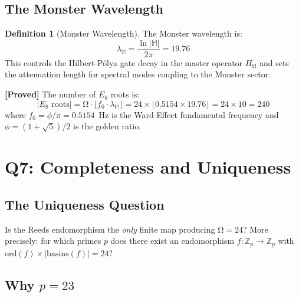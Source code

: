 \documentclass[12pt,a4paper]{article}
\newcommand{\proved}[1]{\textcolor{proved}{\textbf{[Proved]}} #1}
\theoremstyle{definition}\newtheorem{definition}[theorem]{Definition}
\theoremstyle{remark}\newtheorem{remark}[theorem]{Remark}
\renewcommand{\O}{\mathrm{\Omega}}
\newcommand{\Monster}{\mathbb{M}}\newcommand{\Leech}{\Lambda_{24}}
\newcommand{\HOmega}{H_\O}\newcommand{\Jcoup}{J}\newcommand{\Basin}{\mathcal{B}}
\begin{document}
\subsection{The Monster Wavelength}

\begin{definition}[Monster Wavelength]
The Monster wavelength is:
\begin{equation}
  \lambda_\Monster = \frac{\ln|\Monster|}{2\pi} = 19.76
\end{equation}
This controls the Hilbert-P\'olya gate decay in the master operator $\HOmega$
and sets the attenuation length for spectral modes coupling to the Monster
sector.
\end{definition}

\begin{proposition}
\label{prop:e8}
\proved{The number of $E_8$ roots is:}
\begin{equation}
  |E_8 \text{ roots}| = \O \cdot \lfloor f_0 \cdot \lambda_\Monster \rfloor
  = 24 \times \lfloor 0.5154 \times 19.76 \rfloor
  = 24 \times 10 = 240
\end{equation}
where $f_0 = \phi / \pi = 0.5154$~Hz is the Ward Effect fundamental frequency
and $\phi = (1 + \sqrt{5})/2$ is the golden ratio.
\end{proposition}

\section{Q7: Completeness and Uniqueness}
\label{sec:completeness}

\subsection{The Uniqueness Question}

Is the Reeds endomorphism the \emph{only} finite map producing $\O = 24$?
More precisely: for which primes $p$ does there exist an endomorphism
$f: \mathbb{Z}_p \to \mathbb{Z}_p$ with
$\mathrm{ord}(f) \times |\mathrm{basins}(f)| = 24$?

\subsection{Why $p = 23$}
\end{document}
